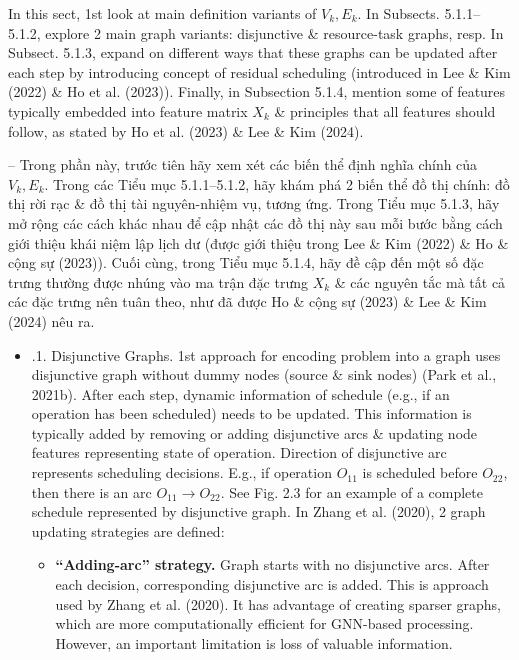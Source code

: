 \documentclass{article}
\begin{document}
\begin{itemize}
\begin{itemize}
        In this sect, 1st look at main definition variants of $V_k,E_k$. In Subsects. 5.1.1--5.1.2, explore 2 main graph variants: disjunctive \& resource-task graphs, resp. In Subsect. 5.1.3, expand on different ways that these graphs can be updated after each step by introducing concept of residual scheduling (introduced in Lee \& Kim (2022) \& Ho et al. (2023)). Finally, in Subsection 5.1.4, mention some of features typically embedded into feature matrix $X_k$ \& principles that all features should follow, as stated by Ho et al. (2023) \& Lee \& Kim (2024).

        -- Trong phần này, trước tiên hãy xem xét các biến thể định nghĩa chính của $V_k,E_k$. Trong các Tiểu mục 5.1.1--5.1.2, hãy khám phá 2 biến thể đồ thị chính: đồ thị rời rạc \& đồ thị tài nguyên-nhiệm vụ, tương ứng. Trong Tiểu mục 5.1.3, hãy mở rộng các cách khác nhau để cập nhật các đồ thị này sau mỗi bước bằng cách giới thiệu khái niệm lập lịch dư (được giới thiệu trong Lee \& Kim (2022) \& Ho \& cộng sự (2023)). Cuối cùng, trong Tiểu mục 5.1.4, hãy đề cập đến một số đặc trưng thường được nhúng vào ma trận đặc trưng $X_k$ \& các nguyên tắc mà tất cả các đặc trưng nên tuân theo, như đã được Ho \& cộng sự (2023) \& Lee \& Kim (2024) nêu ra.
        \begin{itemize}
            \item {.1. Disjunctive Graphs.} 1st approach for encoding problem into a graph uses disjunctive graph without dummy nodes (source \& sink nodes) (Park et al., 2021b). After each step, dynamic information of schedule (e.g., if an operation has been scheduled) needs to be updated. This information is typically added by removing or adding disjunctive arcs \& updating node features representing state of operation. Direction of disjunctive arc represents scheduling decisions. E.g., if operation $O_{11}$ is scheduled before $O_{22}$, then there is an arc $O_{11}\to O_{22}$. See {\sf Fig. 2.3} for an example of a complete schedule represented by disjunctive graph. In Zhang et al. (2020), 2 graph updating strategies are defined:
            \begin{itemize}
                \item {\bf``Adding-arc'' strategy.} Graph starts with no disjunctive arcs. After each decision, corresponding disjunctive arc is added. This is approach used by Zhang et al. (2020). It has advantage of creating sparser graphs, which are more computationally efficient for GNN-based processing. However, an important limitation is loss of valuable information.

\end{itemize}
\end{itemize}
\end{itemize}
\end{itemize}
\end{document}
